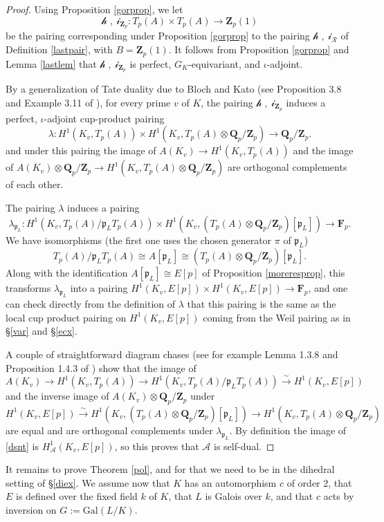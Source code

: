 \documentclass[reqno]{amsart}
\theoremstyle{definition}
\def\Z{\mathbf{Z}}
\def\Q{\mathbf{Q}}
\def\F{\mathbf{F}}
\def\Zp{\Z_p}
\def\Qp{\Q_p}
\def\Fp{\F_p}
\def\A{\mathcal{A}}
\def\cR{\mathcal{R}}
\def\ld{\mathcal{h}}
\def\rd{\mathcal{i}}
\def\P{\mathfrak{p}}
\def\Gal{\mathrm{Gal}}
\def\too{\longrightarrow}
\def\isom{\xrightarrow{\sim}}
\def\Hs#1{H^1_{#1}}
\def\HA{\Hs{\A}}
\def\k{k}
\def\pair#1#2{\ld#1,#2\rd}
\begin{document}
\begin{proof}
Using Proposition \ref{gorprop}, we let 
$$
\pair{\;}{\;}_{\Zp} :  T_p(A) \times T_p(A) \too \Zp(1)
$$
be the pairing corresponding under Proposition \ref{gorprop} to 
the pairing $\pair{\;}{\;}_\cR$ of Definition \ref{lastpair}, with $B = \Zp(1)$.  
It follows from Proposition \ref{gorprop} and Lemma \ref{lastlem} 
that $\pair{\;}{\;}_{\Zp}$ 
is perfect, $G_K$-equivariant, and $\iota$-adjoint.

By a generalization of Tate duality due to Bloch and Kato 
(see Proposition 3.8 and Example 3.11 of \cite{bk}), 
for every prime $v$ of $K$, the  
pairing $\pair{\;}{\;}_{\Zp}$ induces a perfect, $\iota$-adjoint cup-product pairing 
$$
\lambda : H^1(K_v,T_p(A)) \times H^1(K_v,T_p(A) \otimes \Qp/\Zp) \too \Qp/\Zp.
$$
and under this pairing the image of 
$A(K_v) \to H^1(K_v,T_p(A))$ and the image of 
$A(K_v) \otimes \Qp/\Zp \to H^1(K_v,T_p(A) \otimes \Qp/\Zp)$ 
are orthogonal complements of each other.  

The pairing $\lambda$ induces a pairing 
$$
\lambda_{\P_L} :  H^1(K_v,T_p(A)/\P_L T_p(A)) 
    \times H^1(K_v,(T_p(A) \otimes \Qp/\Zp)[\P_L]) \too \Fp.
$$
We have isomorphisms (the first one uses the chosen generator $\pi$ of $\P_L$)
$$
T_p(A)/\P_L T_p(A) \cong A[\P_L] \cong (T_p(A) \otimes \Qp/\Zp)[\P_L].
$$
Along with the identification $A[\P_L] \cong E[p]$ of Proposition \ref{moreresprop},  
this transforms $\lambda_{\P_L}$ into a pairing 
$H^1(K_v,E[p]) \times H^1(K_v,E[p]) \to \Fp$, 
and one can check directly from the definition of $\lambda$ that 
this pairing is the same as the local cup product pairing on $H^1(K_v,E[p])$ 
coming from the Weil pairing as in \S\ref{var} and \S\ref{ecx}.

A couple of straightforward diagram chases (see for example 
Lemma 1.3.8 and Proposition 1.4.3 of \cite{EulerSystems}) 
show that the image of 
\begin{equation}
\label{dsnt}
A(K_v) \to H^1(K_v,T_p(A)) \to H^1(K_v,T_p(A)/\P_L T_p(A)) \isom H^1(K_v,E[p])
\end{equation}
and the inverse image of $A(K_v) \otimes \Qp/\Zp$ under 
$$
H^1(K_v,E[p]) \isom H^1(K_v,(T_p(A) \otimes \Qp/\Zp)[\P_L]) 
    \to H^1(K_v,T_p(A) \otimes \Qp/\Zp)
$$
are equal and are orthogonal complements under $\lambda_{\P_L}$.  
By definition the image of \eqref{dsnt} is $\HA(K_v,E[p])$, 
so this proves that $\A$ is self-dual.
\end{proof}

It remains to prove Theorem \ref{pol}, and for that we need to 
be in the dihedral setting of \S\ref{diex}.  We assume now that $K$ 
has an automorphism $c$ of order $2$, that $E$ is defined over the 
fixed field $\k$ of $K$, that $L$ is Galois over $\k$, and that $c$ acts 
by inversion on $G := \Gal(L/K)$.
\end{document}
